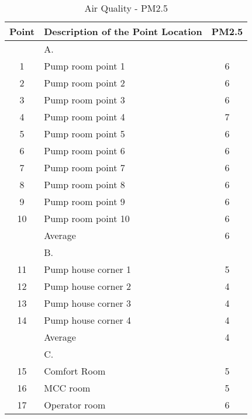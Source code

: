 \begin{table}
	\caption{Air Quality - PM2.5}
	\label{ch047_tbl_pm.txt}
	{\footnotesize

\begin{tabular}{c|l|c}

\hline
Point & Description of the Point Location & PM2.5 \\ 
\hline
 & A. &  \\ 
1 & Pump room point 1 & 6 \\ 
2 & Pump room point 2 & 6 \\ 
3 & Pump room point 3 & 6 \\ 
4 & Pump room point 4 & 7 \\ 
5 & Pump room point 5 & 6 \\ 
6 & Pump room point 6 & 6 \\ 
7 & Pump room point 7 & 6 \\ 
8 & Pump room point 8 & 6 \\ 
9 & Pump room point 9 & 6 \\ 
10 & Pump room point 10 & 6 \\ 
 & Average & 6 \\ 
\hline
 & B. &  \\ 
11 & Pump house corner 1 & 5 \\ 
12 & Pump house corner 2 & 4 \\ 
13 & Pump house corner 3 & 4 \\ 
14 & Pump house corner 4 & 4 \\ 
 & Average & 4 \\ 
\hline
 & C. &  \\ 
15 & Comfort Room & 5 \\ 
16 & MCC room & 5 \\ 
17 & Operator room & 6 \\ 
\hline

\end{tabular}
}
\end{table}